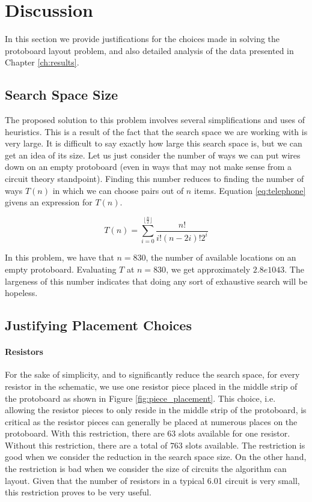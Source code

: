 
\chapter{Discussion}
\label{ch:discussion}

In this section we provide justifications for the choices made in solving the
protoboard layout problem, and also detailed analysis of the data presented in
Chapter \ref{ch:results}.

\section{Search Space Size}

The proposed solution to this problem involves several simplifications and uses
of heuristics. This is a result of the fact that the search space we are working
with is very large. It is difficult to say exactly how large this search space
is, but we can get an idea of its size. Let us just consider the number of ways
we can put wires down on an empty protoboard (even in ways that may not make
sense
from a circuit theory standpoint). Finding this number reduces to finding the
number of ways $T(n)$ in which we can choose pairs out of $n$ items. Equation
\ref{eq:telephone} givens an expression for $T(n)$.

\begin{equation}
T(n) = \sum_{i = 0}^{\lfloor \frac{n}{2} \rfloor}{\frac{n!}{i! (n - 2i)! 2^i}}
\label{eq:telephone}
\end{equation}

In this problem, we have that $n = 830$, the number of available locations on an
empty protoboard. Evaluating $T$ at $n = 830$, we get approximately $2.8e1043$.
The largeness of this number indicates that doing any sort of exhaustive search
will be hopeless.

\section{Justifying Placement Choices}
\label{sec:justify_placement}

\subsubsection{Resistors}

For the sake of simplicity, and to significantly reduce the search space, for
every resistor in the schematic, we use one resistor piece placed in the middle
strip of the protoboard as shown in Figure
\ref{fig:piece_placement}. This choice, i.e. allowing the resistor pieces to
only reside in the middle strip of the protoboard, is critical
as the resistor pieces can generally be placed at numerous places on the
protoboard.
With this restriction, there are $63$ slots available for one resistor. Without
this restriction, there are a total of $763$ slots available. The restriction is
good when we consider the reduction in the search space size. On the other hand,
the restriction is bad when we
consider the size of circuits the algorithm can layout. Given that the number
of resistors in a typical 6.01 circuit is very
small, this restriction proves to be very useful.


